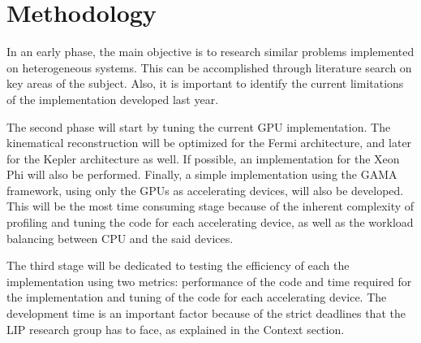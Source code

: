 \section{Methodology}

In an early phase, the main objective is to research similar problems implemented on heterogeneous systems. This can be accomplished through literature search on key areas of the subject. Also, it is important to identify the current limitations of the implementation developed last year.

The second phase will start by tuning the current GPU implementation. The kinematical reconstruction will be optimized for the \nvidia Fermi architecture, and later for the Kepler architecture as well. If possible, an implementation for the \intel Xeon Phi will also be performed. Finally, a simple implementation using the GAMA framework, using only the GPUs as accelerating devices, will also be developed. This will be the most time consuming stage because of the inherent complexity of profiling and tuning the code for each accelerating device, as well as the workload balancing between CPU and the said devices.

The third stage will be dedicated to testing the efficiency of each the implementation using two metrics: performance of the code and time required for the implementation and tuning of the code for each accelerating device. The development time is an important factor because of the strict deadlines that the LIP research group has to face, as explained in the Context section.
